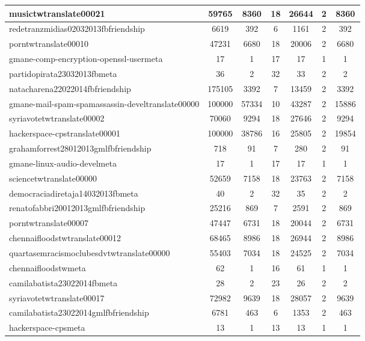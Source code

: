 \begin{table*}[h!]
\begin{center}
\begin{tabular}{| l | c | c | c | c | c | c |}
musictwtranslate00021 & 59765  & 8360  & 18  & 26644  & 2  & 8360 \\\hline
redetranzmidias02032013fbfriendship & 6619  & 392  & 6  & 1161  & 2  & 392 \\\hline
porntwtranslate00010 & 47231  & 6680  & 18  & 20006  & 2  & 6680 \\\hline
gmane-comp-encryption-openssl-usermeta & 17  & 1  & 17  & 17  & 1  & 1 \\\hline
partidopirata23032013fbmeta & 36  & 2  & 32  & 33  & 2  & 2 \\\hline
natacharena22022014fbfriendship & 175105  & 3392  & 7  & 13459  & 2  & 3392 \\\hline
gmane-mail-spam-spamassassin-develtranslate00000 & 100000  & 57334  & 10  & 43287  & 2  & 15886 \\\hline
syriavotetwtranslate00002 & 70060  & 9294  & 18  & 27646  & 2  & 9294 \\\hline
hackerspace-cpstranslate00001 & 100000  & 38786  & 16  & 25805  & 2  & 19854 \\\hline
grahamforrest28012013gmlfbfriendship & 718  & 91  & 7  & 280  & 2  & 91 \\\hline
gmane-linux-audio-develmeta & 17  & 1  & 17  & 17  & 1  & 1 \\\hline
sciencetwtranslate00000 & 52659  & 7158  & 18  & 23763  & 2  & 7158 \\\hline
democraciadiretaja14032013fbmeta & 40  & 2  & 32  & 35  & 2  & 2 \\\hline
renatofabbri20012013gmlfbfriendship & 25216  & 869  & 7  & 2591  & 2  & 869 \\\hline
porntwtranslate00007 & 47447  & 6731  & 18  & 20044  & 2  & 6731 \\\hline
chennaifloodstwtranslate00012 & 68465  & 8986  & 18  & 26944  & 2  & 8986 \\\hline
quartasemracismoclubesdvtwtranslate00000 & 55403  & 7034  & 18  & 24525  & 2  & 7034 \\\hline
chennaifloodstwmeta & 62  & 1  & 16  & 61  & 1  & 1 \\\hline
camilabatista23022014fbmeta & 28  & 2  & 23  & 26  & 2  & 2 \\\hline
syriavotetwtranslate00017 & 72982  & 9639  & 18  & 28057  & 2  & 9639 \\\hline
camilabatista23022014gmlfbfriendship & 6781  & 463  & 6  & 1353  & 2  & 463 \\\hline
hackerspace-cpsmeta & 13  & 1  & 13  & 13  & 1  & 1 \\\hline

\end{tabular}
\end{center}
\end{table*}
